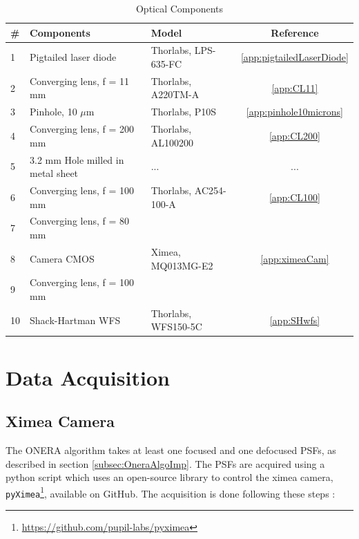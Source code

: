 \begin{table}
\caption{Optical Components}
\label{tab:optComp}
\centering
\begin{tabular}{|l|l|l|c|}
\hline
\textbf{\#}& \textbf{Components} & \textbf{Model} & \textbf{Reference} \\\hline
1 & Pigtailed laser diode & Thorlabs, LPS-635-FC & \ref{app:pigtailedLaserDiode} \\\hline
2 & Converging lens, f = 11 mm & Thorlabs, A220TM-A & \ref{app:CL11} \\\hline
3 & Pinhole, 10 $\mu$m & Thorlabs, P10S & \ref{app:pinhole10microns} \\\hline
4 & Converging lens, f = 200 mm & Thorlabs, AL100200 & \ref{app:CL200} \\\hline
5 & 3.2 mm Hole milled in metal sheet & ... & ... \\\hline
6 & Converging lens, f = 100 mm & Thorlabs, AC254-100-A & \ref{app:CL100} \\\hline
7 & Converging lens, f = 80 mm & & \\\hline
8 & Camera CMOS & Ximea, MQ013MG-E2 & \ref{app:ximeaCam} \\\hline
9 & Converging lens, f = 100 mm & & \\\hline
10 & Shack-Hartman WFS & Thorlabs, WFS150-5C & \ref{app:SHwfs} \\\hline
\end{tabular}
\end{table}

\section{Data Acquisition}
\label{sec:DataAcquis}

\subsection{Ximea Camera}
\label{subsec:acquisXimCam}

The ONERA algorithm takes at least one focused and one defocused PSFs, as described in section \ref{subsec:OneraAlgoImp}. The PSFs are acquired using a python script which uses an open-source library to control the ximea camera, \verb|pyXimea|\footnote{\url{https://github.com/pupil-labs/pyximea}}, available on GitHub. The acquisition is done following these steps : 

